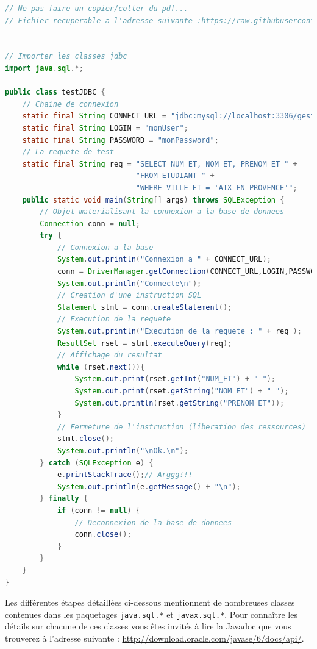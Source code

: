 \documentclass{article}
\begin{document}
\begin{lstlisting}[language=java]
// Ne pas faire un copier/coller du pdf...
// Fichier recuperable a l'adresse suivante :https://raw.githubusercontent.com/nedseb/TpJpa/master/testJDBC.java


// Importer les classes jdbc
import java.sql.*;

public class testJDBC {
    // Chaine de connexion
    static final String CONNECT_URL = "jdbc:mysql://localhost:3306/gestionPedaBD";
    static final String LOGIN = "monUser";
    static final String PASSWORD = "monPassword";
    // La requete de test
    static final String req = "SELECT NUM_ET, NOM_ET, PRENOM_ET " +
                              "FROM ETUDIANT " +
                              "WHERE VILLE_ET = 'AIX-EN-PROVENCE'";                                     
    public static void main(String[] args) throws SQLException {
        // Objet materialisant la connexion a la base de donnees
        Connection conn = null;
        try {
            // Connexion a la base
            System.out.println("Connexion a " + CONNECT_URL);
            conn = DriverManager.getConnection(CONNECT_URL,LOGIN,PASSWORD);
            System.out.println("Connecte\n");
            // Creation d'une instruction SQL
            Statement stmt = conn.createStatement();
            // Execution de la requete
            System.out.println("Execution de la requete : " + req );
            ResultSet rset = stmt.executeQuery(req);
            // Affichage du resultat
            while (rset.next()){    
                System.out.print(rset.getInt("NUM_ET") + " ");
                System.out.print(rset.getString("NOM_ET") + " ");
                System.out.println(rset.getString("PRENOM_ET"));
            }
            // Fermeture de l'instruction (liberation des ressources)
            stmt.close();
            System.out.println("\nOk.\n");
        } catch (SQLException e) {
            e.printStackTrace();// Arggg!!!
            System.out.println(e.getMessage() + "\n");
        } finally {
            if (conn != null) {
                // Deconnexion de la base de donnees
                conn.close();
            }
        }
    }
}
\end{lstlisting}
Les différentes étapes détaillées ci-dessous mentionnent de nombreuses classes contenues dans les paquetages \texttt{java.sql.*} et \texttt{javax.sql.*}. Pour connaître les détails sur chacune de ces classes vous êtes invités à lire la Javadoc que vous trouverez à l'adresse suivante : \url{http://download.oracle.com/javase/6/docs/api/}.
\end{document}
